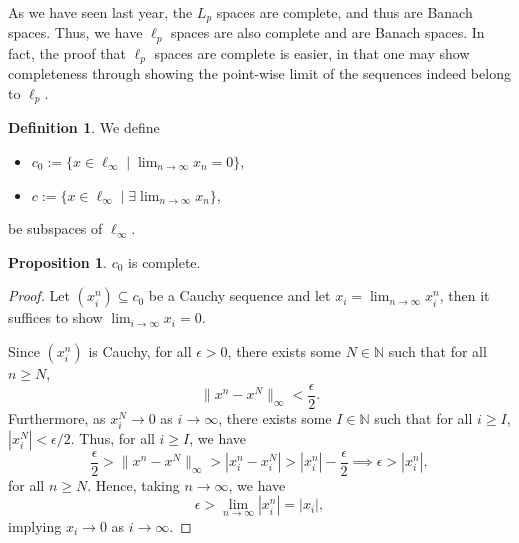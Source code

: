 \documentclass[]{article}
\theoremstyle{definition}
\theoremstyle{definition}
\newtheorem{definition}{Definition}[section]
\newtheorem{proposition}{Proposition}[section]
\begin{document}
As we have seen last year, the \(L_p\) spaces are complete, and thus are 
Banach spaces. Thus, we have \(\ell_p\) spaces are also complete and are 
Banach spaces. In fact, the proof that \(\ell_p\) spaces are complete is 
easier, in that one may show completeness through showing the point-wise 
limit of the sequences indeed belong to \(\ell_p\).

\begin{definition}
  We define 
  \begin{itemize}
    \item \(c_0 := \{x \in \ell_\infty \mid \lim_{n \to \infty} x_n = 0\}\),
    \item \(c := \{x \in \ell_\infty \mid \exists \lim_{n \to \infty} x_n\}\),
  \end{itemize}
  be subspaces of \(\ell_\infty\).
\end{definition}

\begin{proposition}
  \(c_0\) is complete.
\end{proposition}
\begin{proof}
  Let \((x_i^n) \subseteq c_0\) be a Cauchy sequence and let 
  \(x_i = \lim_{n \to \infty} x_i^n\), then it suffices to show 
  \(\lim_{i \to \infty} x_i = 0\). 

  Since \((x_i^n)\) is Cauchy, for all \(\epsilon > 0\), there exists some
  \(N \in \mathbb{N}\) such that for all \(n \ge N\), 
  \[\|x^n - x^N\|_\infty < \frac{\epsilon}{2}.\]
  Furthermore, as \(x_i^N \to 0\) as \(i \to \infty\), there exists some 
  \(I \in \mathbb{N}\) such that for all \(i \ge I\), 
  \(|x_i^N| < \epsilon / 2\). Thus, for all \(i \ge I\), we have 
  \[\frac{\epsilon}{2} > \|x^n - x^N\|_\infty > |x_i^n - x_i^N| >
    |x_i^n| - \frac{\epsilon}{2} \implies \epsilon > |x_i^n|,\]
  for all \(n \ge N\). Hence, taking \(n \to \infty\), we have 
  \[\epsilon > \lim_{n \to \infty} |x_i^n| = |x_i|,\]
  implying \(x_i \to 0\) as \(i \to \infty\).
\end{proof}
\end{document}
